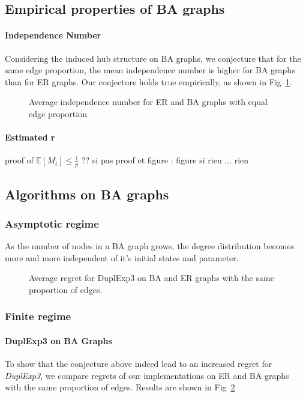 \documentclass[10pt,a4paper]{scrartcl}
\providecommand{\E}{\mathbb{E}}
\begin{document}
\subsection{Empirical properties of BA graphs}
\paragraph{Independence Number}
Considering the induced hub structure on BA graphs, we conjecture that for the same edge proportion, the mean independence number is higher for BA graphs than for ER graphs. Our conjecture holds true empirically, as shown in Fig~\ref{mean_alpha_ba_er}.

\begin{figure}
 \label{mean_alpha_ba_er}
 \caption{Average independence number for ER and BA graphs with equal edge proportion}
\end{figure}

\paragraph{Estimated r}
proof of $\E[M_t] \leq \frac{1}{p}$ ??
si pas proof et figure : figure
si rien ... rien


\subsection{Algorithms on BA graphs}
\subsubsection{Asymptotic regime}
As the number of nodes in a BA graph grows, the degree distribution becomes more and more independent of it's initial states and parameter. 
\begin{figure}
 \label{dupl_er_ba}
 \caption{Average regret for DuplExp3 on BA and ER graphs with the same proportion of edges.}
\end{figure}
\subsubsection{Finite regime}
\paragraph{DuplExp3 on BA Graphs}
To show that the conjecture above indeed lead to an increased regret for \emph{DuplExp3}, we compare regrets of our implementations on ER and BA graphs with the same proportion of edges. Results are shown in Fig~\ref{dupl_er_ba}
\end{document}
